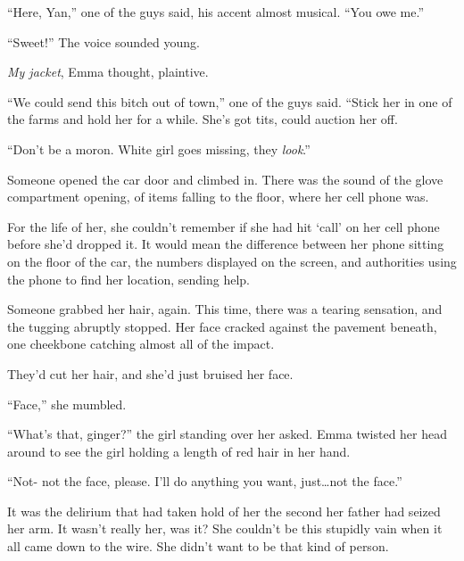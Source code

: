 ``Here, Yan,'' one of the guys said, his accent almost musical.  ``You owe me.''



``Sweet!''  The voice sounded young.



\emph{My jacket}, Emma thought, plaintive.



``We could send this bitch out of town,'' one of the guys said.  ``Stick her in one of the farms and hold her for a while.  She's got tits, could auction her off.



``Don't be a moron.  White girl goes missing, they \emph{look}.''



Someone opened the car door and climbed in.  There was the sound of the glove compartment opening, of items falling to the floor, where her cell phone was.



For the life of her, she couldn't remember if she had hit `call' on her cell phone before she'd dropped it.  It would mean the difference between her phone sitting on the floor of the car, the numbers displayed on the screen, and authorities using the phone to find her location, sending help.



Someone grabbed her hair, again.  This time, there was a tearing sensation, and the tugging abruptly stopped.  Her face cracked against the pavement beneath, one cheekbone catching almost all of the impact.



They'd cut her hair, and she'd just bruised her face.



``Face,'' she mumbled.



``What's that, ginger?'' the girl standing over her asked.  Emma twisted her head around to see the girl holding a length of red hair in her hand.



``Not- not the face, please.  I'll do anything you want, just\ldots not the face.''



It was the delirium that had taken hold of her the second her father had seized her arm.  It wasn't really her, was it?  She couldn't be this stupidly vain when it all came down to the wire.  She didn't want to be that kind of person.



